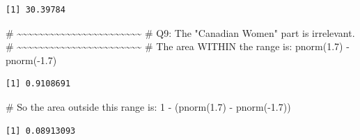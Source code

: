 \documentclass[
  letterpaper,
  DIV=11,
  numbers=noendperiod]{scrreprt}
\newenvironment{Shaded}{\begin{snugshade}}{\end{snugshade}}
\newcommand{\CommentTok}[1]{\textcolor[rgb]{0.37,0.37,0.37}{#1}}
\newcommand{\DecValTok}[1]{\textcolor[rgb]{0.68,0.00,0.00}{#1}}
\newcommand{\FloatTok}[1]{\textcolor[rgb]{0.68,0.00,0.00}{#1}}
\newcommand{\FunctionTok}[1]{\textcolor[rgb]{0.28,0.35,0.67}{#1}}
\newcommand{\NormalTok}[1]{\textcolor[rgb]{0.00,0.23,0.31}{#1}}
\newcommand{\SpecialCharTok}[1]{\textcolor[rgb]{0.37,0.37,0.37}{#1}}
\begin{document}
\begin{verbatim}
[1] 30.39784
\end{verbatim}

\begin{Shaded}
\begin{Highlighting}[]
\CommentTok{\# \textasciitilde{}\textasciitilde{}\textasciitilde{}\textasciitilde{}\textasciitilde{}\textasciitilde{}\textasciitilde{}\textasciitilde{}\textasciitilde{}\textasciitilde{}\textasciitilde{}\textasciitilde{}\textasciitilde{}\textasciitilde{}\textasciitilde{}\textasciitilde{}\textasciitilde{}\textasciitilde{}\textasciitilde{}\textasciitilde{}\textasciitilde{}\textasciitilde{}\textasciitilde{}}
\CommentTok{\# Q9: The "Canadian Women" part is irrelevant.}
\CommentTok{\# \textasciitilde{}\textasciitilde{}\textasciitilde{}\textasciitilde{}\textasciitilde{}\textasciitilde{}\textasciitilde{}\textasciitilde{}\textasciitilde{}\textasciitilde{}\textasciitilde{}\textasciitilde{}\textasciitilde{}\textasciitilde{}\textasciitilde{}\textasciitilde{}\textasciitilde{}\textasciitilde{}\textasciitilde{}\textasciitilde{}\textasciitilde{}\textasciitilde{}\textasciitilde{}}
\CommentTok{\# The area WITHIN the range is:}
\FunctionTok{pnorm}\NormalTok{(}\FloatTok{1.7}\NormalTok{) }\SpecialCharTok{{-}} \FunctionTok{pnorm}\NormalTok{(}\SpecialCharTok{{-}}\FloatTok{1.7}\NormalTok{)}
\end{Highlighting}
\end{Shaded}

\begin{verbatim}
[1] 0.9108691
\end{verbatim}

\begin{Shaded}
\begin{Highlighting}[]
\CommentTok{\# So the area outside this range is:}
\DecValTok{1} \SpecialCharTok{{-}}\NormalTok{ (}\FunctionTok{pnorm}\NormalTok{(}\FloatTok{1.7}\NormalTok{) }\SpecialCharTok{{-}} \FunctionTok{pnorm}\NormalTok{(}\SpecialCharTok{{-}}\FloatTok{1.7}\NormalTok{))}
\end{Highlighting}
\end{Shaded}

\begin{verbatim}
[1] 0.08913093
\end{verbatim}
\end{document}
